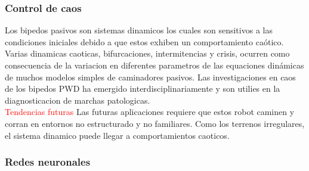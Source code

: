 \documentclass[10pt,onecolumn,twoside,letterpaper]{article}
\begin{document}
\subsubsection{Control de caos}
Los bipedos pasivos son sistemas dinamicos los cuales son sensitivos a las condiciones iniciales debido a que estos exhiben un comportamiento ca\'otico. Varias dinamicas caoticas, bifurcaciones, intermitencias y crisis, ocurren como consecuencia de la variacion en diferentes parametros de las equaciones din\'amicas de muchos modelos simples de caminadores pasivos. Las investigaciones en caos de los bipedos PWD ha emergido interdisciplinariamente y son utilies en la diagnosticacion de marchas patologicas.\cite{Iqbal2014}\\
\textcolor{red}{Tendencias futuras} Las futuras aplicaciones requiere que estos robot caminen y corran en entornos no estructurado y no familiares. Como los terrenos irregulares, el sistema dinamico puede llegar a comportamientos caoticos.\cite{Iqbal2014}
\subsubsection{Redes neuronales}
\end{document}
